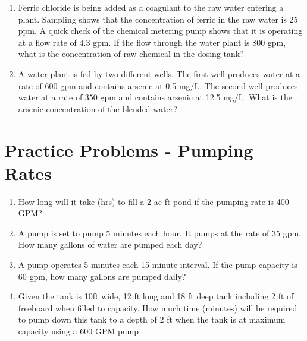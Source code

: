 \begin{enumerate}
\item Ferric chloride is being added as a coagulant to the raw water entering a plant. Sampling
shows that the concentration of ferric in the raw water is 25 ppm. A quick check of the chemical
metering pump shows that it is operating at a flow rate of 4.3 gpm. If the flow through the water
plant is 800 gpm, what is the concentration of raw chemical in the dosing tank?

\item A water plant is fed by two different wells. The first well produces water at a rate of 600
gpm and contains arsenic at 0.5 mg/L. The second well produces water at a rate of 350 gpm and
contains arsenic at 12.5 mg/L. What is the arsenic concentration of the blended water?
\end{enumerate}

\section*{Practice Problems - Pumping Rates}
\begin{enumerate}
\item How long will it take (hrs) to fill a 2 ac-ft pond if the pumping rate is 400 GPM?

\item A pump is set to pump 5 minutes each hour. It pumps at the rate of 35 gpm. How many gallons of water are pumped each day?\\

\item A pump operates 5 minutes each 15 minute interval.  If the pump capacity is 60 gpm, how many gallons are pumped daily?\\

\item Given the tank is 10ft wide, 12 ft long and 18 ft deep tank including 2 ft of freeboard when filled to capacity. How much time (minutes) will be required to pump down this tank to a depth of 2 ft when the tank is at maximum capacity using a 600 GPM pump\\

\end{enumerate}


